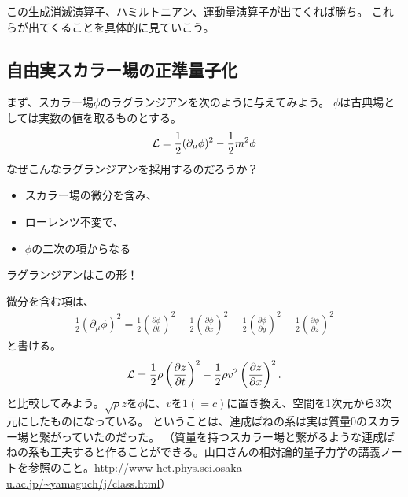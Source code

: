 \documentclass[10pt,a4paper]{jarticle}
\begin{document}
この生成消滅演算子、ハミルトニアン、運動量演算子が出てくれば勝ち。
これらが出てくることを具体的に見ていこう。


\subsection{自由実スカラー場の正準量子化}
まず、スカラー場$\phi$のラグランジアンを次のように与えてみよう。
$\phi$は古典場としては実数の値を取るものとする。
\begin{align}
{\cal L} = \frac{1}{2}(\partial_\mu \phi)^2 - \frac{1}{2}m^2\phi
\end{align}
なぜこんなラグランジアンを採用するのだろうか？
\begin{itemize}
\item スカラー場の微分を含み、
\item ローレンツ不変で、
\item $\phi$の二次の項からなる
\end{itemize}
ラグランジアンはこの形！

微分を含む項は、
\begin{align}
\frac{1}{2}(\partial_\mu \phi)^2
=
\frac{1}{2}\left( \frac{\partial\phi}{\partial t} \right)^2
- \frac{1}{2}\left( \frac{\partial\phi}{\partial x} \right)^2
- \frac{1}{2}\left( \frac{\partial\phi}{\partial y} \right)^2
- \frac{1}{2}\left( \frac{\partial\phi}{\partial z} \right)^2
\end{align}
と書ける。
\begin{align}
{\cal L} =
 \frac{1}{2} \rho \left( \frac{\partial z}{\partial t} \right)^2
 -  \frac{1}{2} \rho v^2 \left( \frac{\partial z}{\partial x} \right)^2.
\end{align}
と比較してみよう。$\sqrt{\rho} z$を$\phi$に、$v$を$1 (=c)$に置き換え、空間を1次元から3次元にしたものになっている。
ということは、連成ばねの系は実は質量0のスカラー場と繋がっていたのだった。
（質量を持つスカラー場と繋がるような連成ばねの系も工夫すると作ることができる。山口さんの相対論的量子力学の講義ノートを参照のこと。\url{http://www-het.phys.sci.osaka-u.ac.jp/~yamaguch/j/class.html}）

%
\end{document}

